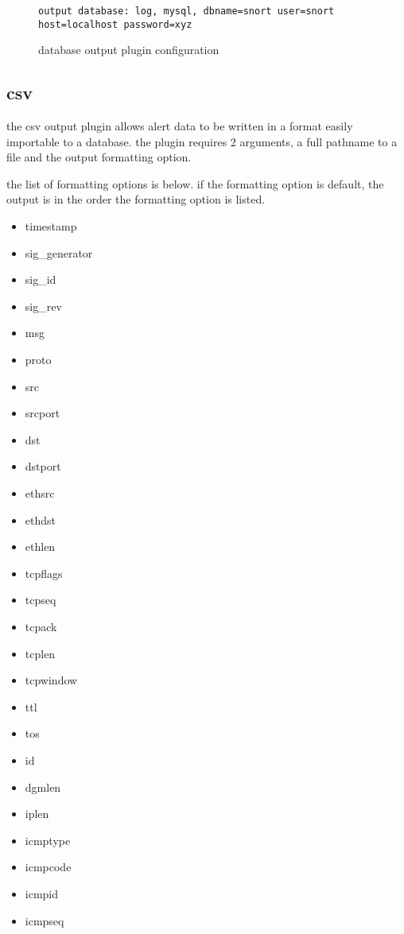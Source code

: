 \documentclass[english]{report}
\begin{document}
\begin{figure}[!hbpt]
\begin{verbatim}
output database: log, mysql, dbname=snort user=snort host=localhost password=xyz
\end{verbatim}

\caption{\label{database output config}database output plugin configuration}
\end{figure}



\subsection{csv}

the csv output plugin allows alert data to be written in a format
easily importable to a database. the plugin requires 2 arguments,
a full pathname to a file and the output formatting option. 

the list of formatting options is below. if the formatting option
is default, the output is in the order the formatting option is listed.

\begin{itemize}
\item timestamp
\item sig\_generator
\item sig\_id
\item sig\_rev
\item msg
\item proto
\item src
\item srcport
\item dst
\item dstport
\item ethsrc
\item ethdst
\item ethlen
\item tcpflags
\item tcpseq
\item tcpack
\item tcplen
\item tcpwindow
\item ttl
\item tos
\item id
\item dgmlen
\item iplen
\item icmptype
\item icmpcode
\item icmpid
\item icmpseq
\end{itemize}
\end{document}
